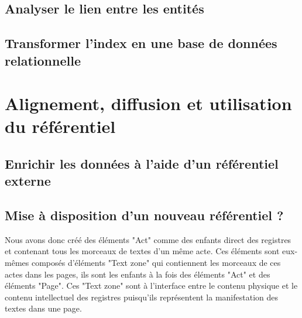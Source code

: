 \documentclass[a4paper,12pt,twoside]{book}
\begin{document}
	\chapter{Analyser le lien entre les entités}
	
	\chapter{Transformer l’index en une base de données relationnelle}	
	
	\part{Alignement, diffusion et utilisation du référentiel}
	
	\chapter{Enrichir les données à l’aide d’un référentiel externe}
	
	\chapter{Mise à disposition d'un nouveau référentiel ?}
	
		Nous avons donc créé des éléments "Act" comme des enfants direct des registres et contenant tous les morceaux de textes d'un même acte. Ces éléments sont eux-mêmes composés d'éléments "Text zone" qui contiennent les morceaux de ces actes dans les pages, ils sont les enfants à la fois des éléments "Act" et des éléments "Page". Ces "Text zone" sont à l'interface entre le contenu physique et le contenu intellectuel des registres puisqu'ils représentent la manifestation des textes dans une page.
	
\end{document}
